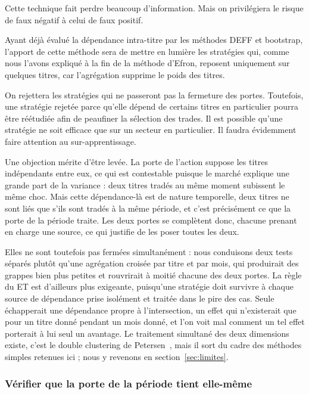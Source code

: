 Cette technique fait perdre beaucoup d'information. Mais on privilégiera
le risque de faux négatif à celui de faux positif.

Ayant déjà évalué la dépendance intra-titre par les méthodes DEFF et bootstrap,
l'apport de cette méthode sera de mettre en lumière les stratégies qui, comme
nous l'avons expliqué à la fin de la méthode d'Efron, reposent uniquement sur
quelques titres, car l'agrégation supprime le poids des titres.

On rejettera les stratégies qui ne passeront pas la fermeture des portes.
Toutefois, une stratégie rejetée parce qu'elle dépend de certains titres en
particulier pourra être réétudiée afin de peaufiner la sélection des trades.
Il est possible qu'une stratégie ne soit efficace que sur un secteur en
particulier. Il faudra évidemment faire attention au sur-apprentissage.

Une objection mérite d'être levée. La porte de l'action suppose les titres
indépendants entre eux, ce qui est contestable puisque le marché explique une
grande part de la variance : deux titres tradés au même moment subissent le
même choc. Mais cette dépendance-là est de nature temporelle, deux titres ne
sont liés que s'ils sont tradés à la même période, et c'est précisément ce que
la porte de la période traite. Les deux portes se complètent donc, chacune
prenant en charge une source, ce qui justifie de les poser toutes les deux.

Elles ne sont toutefois pas fermées simultanément : nous conduisons deux tests
séparés plutôt qu'une agrégation croisée par titre et par mois, qui produirait
des grappes bien plus petites et rouvrirait à moitié chacune des deux portes.
La règle du ET est d'ailleurs plus exigeante, puisqu'une stratégie doit
survivre à chaque source de dépendance prise isolément et traitée dans le pire
des cas. Seule échapperait une dépendance propre à l'intersection, un effet
qui n'existerait que pour un titre donné pendant un mois donné, et l'on voit
mal comment un tel effet porterait à lui seul un avantage. Le traitement
simultané des deux dimensions existe, c'est le double clustering de
Petersen~\cite{petersen2009}, mais il sort du cadre des méthodes simples
retenues ici ; nous y revenons en section~\ref{sec:limites}.

\subsubsection*{Vérifier que la porte de la période tient elle-même}

